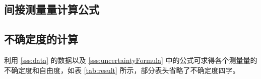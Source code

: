 \documentclass[a4paper,utf8]{article}
\begin{document}
\subsection{间接测量量计算公式}
\subsection{不确定度的计算}
利用 \ref{sss:data} 的数据以及 \ref{sss:uncertaintyFormula} 中的公式可求得各个测量量的不确定度和自由度，如表 \ref{tab:result} 所示，部分表头省略了不确定度四字。
\end{document}
